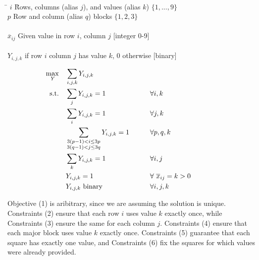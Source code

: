 \documentclass[10pt]{article}
\begin{document}
\begin{tabbing}
\\[0.2cm]
\hspace*{.5cm} \= $i$ \hspace{2.8cm} \= Rows, columns (alias $j$), and values (alias $k$) $\{1,...,9\}$ \\
\> $p$ \> Row and column (alias $q$) blocks $\{1,2,3\}$\\[0.2cm]
\\[0.2cm] 
\> $\overline{x}_{ij}$ \> Given value in row $i$, column $j$ [integer 0-9] \\[0.2cm]
\\
\> $Y_{i,j,k}$  if row $i$ column $j$ has value $k$, 0 otherwise [binary]\\[0.2cm]
\end{tabbing}
\begin{alignat}{3}
\max_{ \tiny{\it Y}} \quad & \sum_{i,j,k} Y_{i,j,k} \\
\mbox{s.t.} \quad & \sum_{j} Y_{i,j,k} = 1 &\qquad&  \forall i,k &\qquad& \\
& \sum_{i} Y_{i,j,k} = 1 & & \forall j,k \\
& \sum\limits_{\begin{subarray}{c} 3(p-1) < i \le 3p \\ 3(q-1) < j \le 3q \end{subarray} } Y_{i,j,k} = 1 &\qquad& \forall p,q,k \\
& \sum_{k} Y_{i,j,k} = 1 &\qquad& \forall i,j \\
& Y_{i,j,k} = 1 && \forall ~ {\overline x}_{ij} = k > 0 \\
& Y_{i,j,k} ~ {\rm binary} && \forall i,j,k \nonumber
\end{alignat}


Objective (1) is aribitrary, since we are assuming the solution is unique.  Constraints (2) ensure that each row $i$ uses value $k$ exactly once, while Constraints (3) ensure the same for each column $j$.  Constraints (4) ensure that each major block uses value $k$ exactly once.  Constraints (5) guarantee that each square has exactly one value, and Constraints (6) fix the squares for which values were already provided.  
\end{document}
